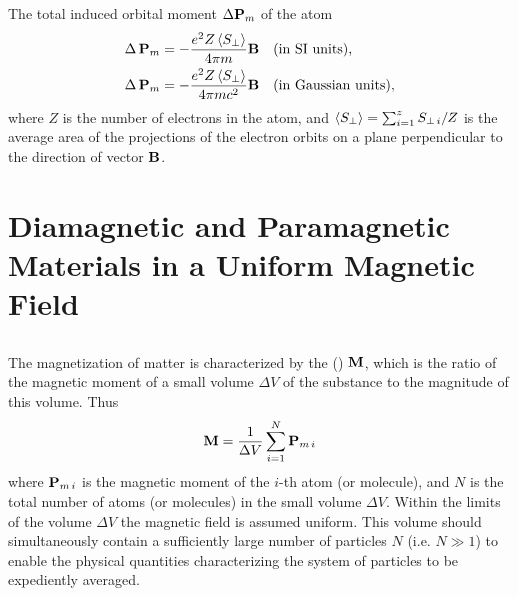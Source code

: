 The total induced orbital moment $\Delta \vb{P}_{m}$ of the atom 
\begin{align*}%
\Delta \, \vb{P}_{m} & =  -\frac{e^{2}Z \expval{S_{\perp}}}{4 \pi m} \vb{B}&& \text{(in SI units),} \\
\Delta \, \vb{P}_{m} & =  -\frac{e^{2}Z \expval{S_{\perp}}}{4 \pi m c^{2}} \vb{B} && \text{(in Gaussian units)},
\end{align*}
where $Z$ is the number of electrons in the atom, and $\expval{S_{\perp}} = \sum_{i=1}^{z} S_{\perp \, i} /Z$ is the average area of the projections of the electron orbits on a plane perpendicular to the direction of vector $\vb{B}$.

\section[Magnetic Materials in a Magnetic Field]{Diamagnetic and Paramagnetic Materials in a Uniform Magnetic Field
}
\label{sec-26.3}

\subsection{}\label{26.3.1} The magnetization of matter is characterized by the  () $\vb{M}$, which is the ratio of the magnetic moment of a small volume $\Delta V$ of the substance to the magnitude of this volume. Thus
\begin{equation*}%
\vb{M} = \frac{1}{\Delta V} \sum_{i =1}^{N} \vb{P}_{m\,i}
\end{equation*}
where $\vb{P}_{m\,i}$ is the magnetic moment of the $i$-th atom (or molecule), and $N$ is the total number of atoms (or molecules) in the small volume $\Delta V$. Within the limits of the volume $\Delta V$ the magnetic field is assumed uniform. This volume should simultaneously contain a sufficiently large number of particles $N$ (i.e. $N \gg 1$) to enable the physical quantities characterizing the system of particles to be expediently averaged.

